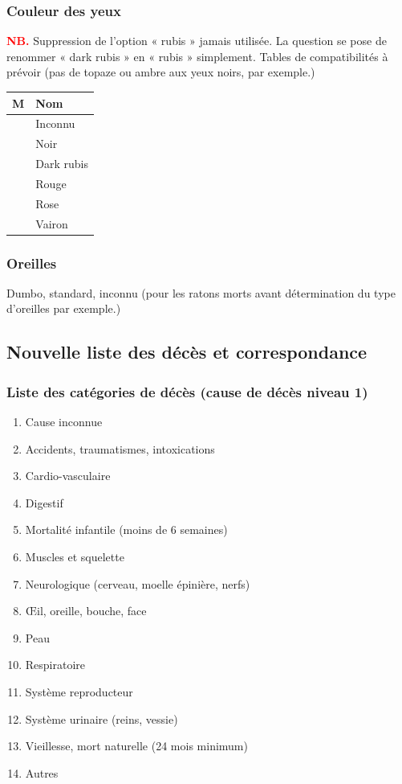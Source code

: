 ﻿\documentclass[a4paper,10pt]{article}
\newcommand\desire[1]{\noindent\textbf{\textcolor{red}{#1}}}
\begin{document}
\subsubsection{Couleur des yeux}
\desire{NB.} Suppression de l'option « rubis » jamais utilisée. La question se pose de renommer « dark rubis » en « rubis » simplement. Tables de compatibilités à prévoir (pas de topaze ou ambre aux yeux noirs, par exemple.)   
   
\begin{longtable}{|c|l|}\hline
\textbf{M} & \textbf{Nom} \\\hline
 & Inconnu \\\hline
 & Noir \\\hline
 & Dark rubis \\\hline
 & Rouge \\\hline
 & Rose \\\hline
 & Vairon \\\hline
\end{longtable}

\subsubsection{Oreilles}
Dumbo, standard, inconnu (pour les ratons morts avant détermination du type d'oreilles par exemple.)  

\subsection{Nouvelle liste des décès et correspondance}
\subsubsection{Liste des catégories de décès (cause de décès niveau 1)}

\begin{enumerate}
\item Cause inconnue
\item Accidents, traumatismes, intoxications
\item Cardio-vasculaire
\item Digestif
\item Mortalité infantile (moins de 6 semaines)
\item Muscles et squelette
\item Neurologique (cerveau, moelle épinière, nerfs)
\item Œil, oreille, bouche, face
\item Peau
\item Respiratoire
\item Système reproducteur
\item Système urinaire (reins, vessie)
\item Vieillesse, mort naturelle (24 mois minimum)
\item Autres
\end{enumerate}
\end{document}
